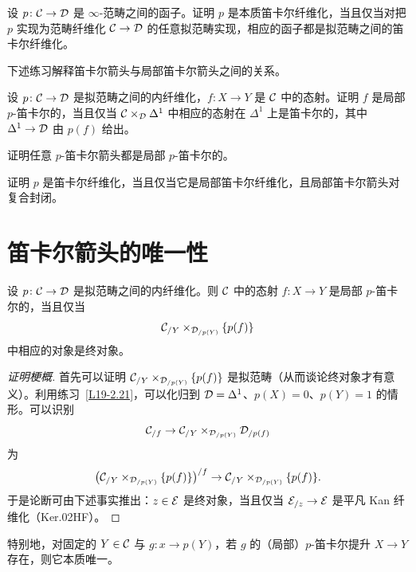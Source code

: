 \begin{exercise}\label{L19-2.19}
设 $p\colon\mathcal{C}\to\mathcal{D}$ 是 $\infty$-范畴之间的函子。证明 $p$ 是本质笛卡尔纤维化，当且仅当对把 $p$ 实现为范畴纤维化 $\mathcal{C}\to\mathcal{D}$ 的任意拟范畴实现，相应的函子都是拟范畴之间的笛卡尔纤维化。
\end{exercise}

\nitem\label{L19-2.20} 下述练习解释笛卡尔箭头与局部笛卡尔箭头之间的关系。

\begin{exercise}\label{L19-2.21}
设 $p\colon\mathcal{C}\to\mathcal{D}$ 是拟范畴之间的内纤维化，$f\colon X\to Y$ 是 $\mathcal{C}$ 中的态射。证明 $f$ 是局部 $p$-笛卡尔的，当且仅当 $\mathcal{C}\times_{\mathcal{D}}\Delta^1$ 中相应的态射在 $\Delta^1$ 上是笛卡尔的，其中 $\Delta^1\to\mathcal{D}$ 由 $p(f)$ 给出。
\end{exercise}

\begin{exercise}\label{L19-2.22}
证明任意 $p$-笛卡尔箭头都是局部 $p$-笛卡尔的。
\end{exercise}

\begin{exercise}\label{L19-2.23}
证明 $p$ 是笛卡尔纤维化，当且仅当它是局部笛卡尔纤维化，且局部笛卡尔箭头对复合封闭。
\end{exercise}

\section{笛卡尔箭头的唯一性}

\begin{proposition}\label{L19-3.1}
设 $p\colon\mathcal{C}\to\mathcal{D}$ 是拟范畴之间的内纤维化。则 $\mathcal{C}$ 中的态射 $f\colon X\to Y$ 是局部 $p$-笛卡尔的，当且仅当
\[
\mathcal{C}_{/Y}\times_{\mathcal{D}_{/p(Y)}}\{p(f)\}
\]
中相应的对象是终对象。
\end{proposition}

\begin{proof}[证明梗概]
首先可以证明 $\mathcal{C}_{/Y}\times_{\mathcal{D}_{/p(Y)}}\{p(f)\}$ 是拟范畴（从而谈论终对象才有意义）。利用练习~\ref{L19-2.21}，可以化归到 $\mathcal{D}=\Delta^1$、$p(X)=0$、$p(Y)=1$ 的情形。可以识别
\[
\mathcal{C}_{/f}\to\mathcal{C}_{/Y}\times_{\mathcal{D}_{/p(Y)}}\mathcal{D}_{/p(f)}
\]
为
\[
\bigl(\mathcal{C}_{/Y}\times_{\mathcal{D}_{/p(Y)}}\{p(f)\}\bigr)^{/f}\to\mathcal{C}_{/Y}\times_{\mathcal{D}_{/p(Y)}}\{p(f)\}.
\]
于是论断可由下述事实推出：$z\in\mathcal{E}$ 是终对象，当且仅当 $\mathcal{E}_{/z}\to\mathcal{E}$ 是平凡 Kan 纤维化（Ker.02HF）。
\end{proof}

\nitem\label{L19-3.2} 特别地，对固定的 $Y\in\mathcal{C}$ 与 $g\colon x\to p(Y)$，若 $g$ 的（局部）$p$-笛卡尔提升 $X\to Y$ 存在，则它本质唯一。

